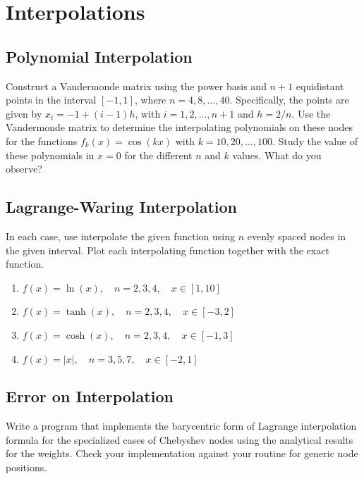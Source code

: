 \section{Interpolations}
\subsection{Polynomial Interpolation}
\begin{exercise}
    Construct a Vandermonde matrix using the power basis and $n+1$ equidistant points in the interval $[-1,1]$, where $n=4,8,\ldots,40$. 
    Specifically, the points are given by $x_i=-1+(i-1)h$, with $i=1,2,\ldots,n+1$ and $h=2/n$. Use the Vandermonde matrix to determine the interpolating polynomials on these nodes for the functions $f_k(x)=\cos(kx)$ with $k=10,20,\ldots,100$. Study the value of these polynomials in $x=0$ for the different $n$ and $k$ values. What do you observe?
\end{exercise}

\subsection{Lagrange-Waring Interpolation}

\begin{exercise}
    In each case, use interpolate the given function using \( n \) evenly spaced nodes in the given interval. Plot each interpolating function together with the exact function.
    \begin{enumerate}
        \item \( f(x) = \ln (x), \quad n = 2,3,4, \quad x\in [1,10] \)
        \item \( f(x) = \tanh (x), \quad n = 2,3,4, \quad x \in [-3,2] \)
        \item \( f(x) = \cosh (x), \quad n = 2,3,4, \quad x \in [-1,3] \)
        \item \( f(x) = |x|, \quad n = 3,5,7, \quad x \in [-2,1] \)
    \end{enumerate}
\end{exercise}

\subsection{Error on Interpolation}
\begin{exercise}
    Write a program that implements the barycentric form of Lagrange interpolation formula for the specialized cases of Chebyshev nodes using the analytical results for the weights. Check your implementation against your routine for generic node positions.
\end{exercise}


